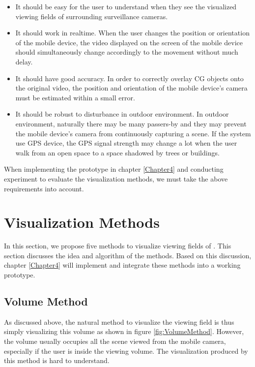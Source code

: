 \begin{itemize}
	\item It should be easy for the user to understand when they see the visualized viewing fields of surrounding surveillance cameras.
	\item It should work in realtime. When the user changes the position or orientation of the mobile device, the video displayed on the screen of the mobile device should simultaneously change accordingly to the movement without much delay.
	\item It should have good accuracy. In order to correctly overlay CG objects onto the original video, the position and orientation of the mobile device's camera must be estimated within a small error.
	\item It should be robust to disturbance in outdoor environment. In outdoor environment, naturally there may be many passers-by and they may prevent the mobile device's camera from continuously capturing a scene. If the system use GPS device, the GPS signal strength may change a lot when the user walk from an open space to a space shadowed by trees or buildings.
\end{itemize}

When implementing the prototype in chapter \ref{Chapter4} and conducting experiment to evaluate the visualization methods, we must take the above requirements into account.


\section{Visualization Methods}
\label{VisualizationMethods}

In this section, we propose five methods to visualize viewing fields of . This section discusses the idea and algorithm of the methods. Based on this discussion, chapter \ref{Chapter4} will implement and integrate these methods into a working prototype.

\subsection{Volume Method}

As discussed above, the natural method to visualize the viewing field is thus simply visualizing this volume as shown in figure \ref{fig:VolumeMethod}. However, the volume usually occupies all the scene viewed from the mobile camera, especially if the user is inside the viewing volume. The visualization produced by this method is hard to understand.

